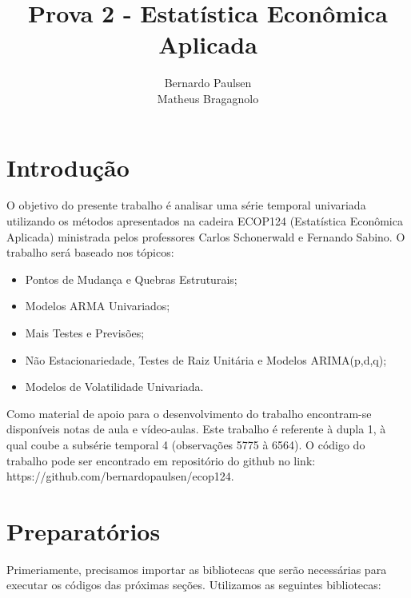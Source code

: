 \documentclass{article}\usepackage[]{graphicx}\usepackage[]{color}
\author{Bernardo Paulsen \\ Matheus Bragagnolo}
\title{Prova 2 - Estatística Econômica Aplicada}
\date{ }
\begin{document}
\maketitle

\tableofcontents


\section{Introdução}

    O objetivo do presente trabalho é analisar uma série temporal univariada utilizando os métodos apresentados na cadeira ECOP124 (Estatística Econômica Aplicada) ministrada pelos professores Carlos Schonerwald e Fernando Sabino. O trabalho será baseado nos tópicos:
    
    \begin{itemize}
        \item Pontos de Mudança e Quebras Estruturais;
        \item Modelos ARMA Univariados;
        \item Mais Testes e Previsões;
        \item Não Estacionariedade, Testes de Raiz Unitária e Modelos ARIMA(p,d,q);
        \item Modelos de Volatilidade Univariada.
    \end{itemize}
    
    Como material de apoio para o desenvolvimento do trabalho encontram-se disponíveis notas de aula e vídeo-aulas. Este trabalho é referente à dupla 1, à qual coube a subsérie temporal 4 (observações 5775 à 6564). O código do trabalho pode ser encontrado em repositório do github no link: https://github.com/bernardopaulsen/ecop124.


\section{Preparatórios}

    Primeriamente, precisamos importar as bibliotecas que serão necessárias para executar os códigos das próximas seções. Utilizamos as seguintes bibliotecas:
    
\end{document}
